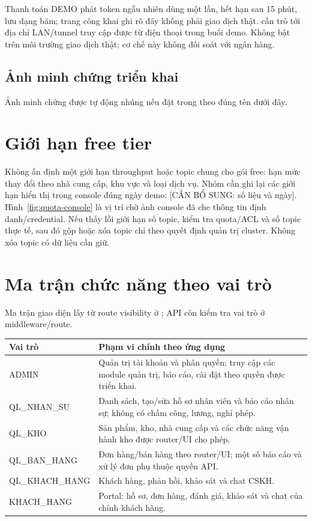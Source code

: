 Thanh toán DEMO phát token ngẫu nhiên dùng một lần, hết hạn sau 15 phút, lưu dạng băm; trang công khai ghi rõ đây không phải giao dịch thật. \texttt{} cần trỏ tới địa chỉ LAN/tunnel truy cập được từ điện thoại trong buổi demo. Không bật trên môi trường giao dịch thật; cơ chế này không đối soát với ngân hàng.

\subsection{Ảnh minh chứng triển khai}
Ảnh minh chứng được tự động nhúng nếu đặt trong \texttt{} theo đúng tên dưới đây.

\section{Giới hạn free tier}
Không ấn định một giới hạn throughput hoặc topic chung cho gói free: hạn mức thay đổi theo nhà cung cấp, khu vực và loại dịch vụ. Nhóm cần ghi lại các giới hạn hiển thị trong console đúng ngày demo: [CẦN BỔ SUNG: số liệu và ngày]. Hình~\ref{fig:quota-console} là vị trí chờ ảnh console đã che thông tin định danh/credential. Nếu thấy lỗi giới hạn số topic, kiểm tra quota/ACL và số topic thực tế, sau đó gộp hoặc xóa topic chỉ theo quyết định quản trị cluster. Không xóa topic có dữ liệu cần giữ.

\section{Ma trận chức năng theo vai trò}
Ma trận giao diện lấy từ route visibility ở \texttt{}; API còn kiểm tra vai trò ở middleware/route.
\small
\begin{longtable}{|p{}|p{}|}\hline
\textbf{Vai trò}&\textbf{Phạm vi chính theo ứng dụng}\\
\hline\endhead
ADMIN&Quản trị tài khoản và phân quyền; truy cập các module quản trị, báo cáo, cài đặt theo quyền được triển khai.\\
\hline
QL\_NHAN\_SU&Danh sách, tạo/sửa hồ sơ nhân viên và báo cáo nhân sự; không có chấm công, lương, nghỉ phép.\\
\hline
QL\_KHO&Sản phẩm, kho, nhà cung cấp và các chức năng vận hành kho được router/UI cho phép.\\
\hline
QL\_BAN\_HANG&Đơn hàng/bán hàng theo router/UI; một số báo cáo và xử lý đơn phụ thuộc quyền API.\\
\hline
QL\_KHACH\_HANG&Khách hàng, phản hồi, khảo sát và chat CSKH.\\
\hline
KHACH\_HANG&Portal: hồ sơ, đơn hàng, đánh giá, khảo sát và chat của chính khách hàng.\\
\hline
\end{longtable}
\normalsize

